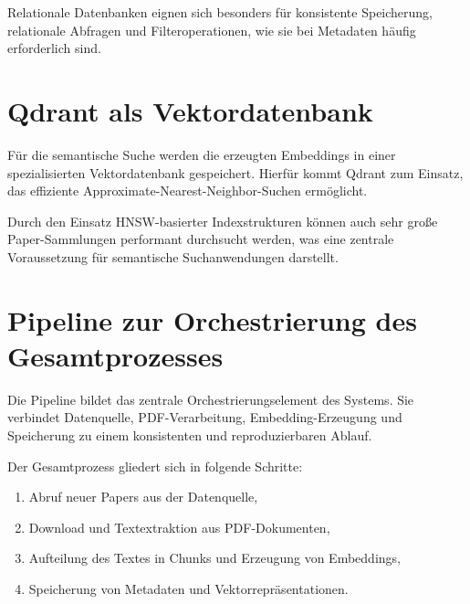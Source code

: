 

Relationale Datenbanken eignen sich besonders für konsistente Speicherung, relationale Abfragen und Filteroperationen, wie sie bei Metadaten häufig erforderlich sind.

\section{Qdrant als Vektordatenbank}

Für die semantische Suche werden die erzeugten Embeddings in einer spezialisierten Vektordatenbank gespeichert. Hierfür kommt Qdrant zum Einsatz, das effiziente Approximate-Nearest-Neighbor-Suchen ermöglicht.



Durch den Einsatz HNSW-basierter Indexstrukturen können auch sehr große Paper-Sammlungen performant durchsucht werden, was eine zentrale Voraussetzung für semantische Suchanwendungen darstellt.

\section{Pipeline zur Orchestrierung des Gesamtprozesses}

Die Pipeline bildet das zentrale Orchestrierungselement des Systems. Sie verbindet Datenquelle, PDF-Verarbeitung, Embedding-Erzeugung und Speicherung zu einem konsistenten und reproduzierbaren Ablauf.



Der Gesamtprozess gliedert sich in folgende Schritte:

\begin{enumerate}
	\item Abruf neuer Papers aus der Datenquelle,
	\item Download und Textextraktion aus PDF-Dokumenten,
	\item Aufteilung des Textes in Chunks und Erzeugung von Embeddings,
	\item Speicherung von Metadaten und Vektorrepräsentationen.
\end{enumerate}

